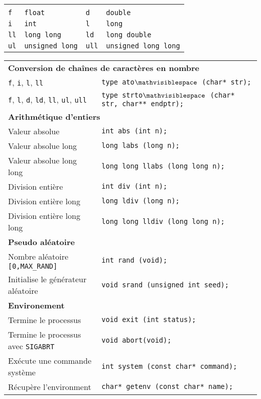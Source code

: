 \documentclass{article}
\newcommand{\spc}{$\mathvisiblespace$}
\newcommand{\cd}{\lstinline}
\begin{document}
\begin{multicols*}{3}
\begin{tabularx}{\linewidth}{
  >{\hsize=0.2\hsize}X%
  >{\hsize=1.8\hsize}X%
  >{\hsize=0.2\hsize}X%
  >{\hsize=1.8\hsize}X%
  }
  \multicolumn{4}{l}{\bf Suffix pour fonctions \cd{ato}\texttt{\spc} et \cd{strto}\texttt{\spc}}  \\
  \cd{f}  & \cd{float} & \cd{d} & \cd{double} \\
  \cd{i}  & \cd{int} & \cd{l} & \cd{long} \\
  \cd{ll}  & \cd{long long} & \cd{ld} & \cd{long double} \\
  \cd{ul}  & \cd{unsigned long} & \cd{ull} & \cd{unsigned long long} \\
\end{tabularx}

\begin{tabularx}{\linewidth}{Xl}
  \multicolumn{2}{l}{\bf Conversion de chaînes de caractères en nombre} \\
  \cd{f}, \cd{i}, \cd{l}, \cd{ll} & \cd{type ato}\texttt{\spc}\cd{ (char* str);} \\
  \cd{f}, \cd{l}, \cd{d}, \cd{ld}, \cd{ll}, \cd{ul}, \cd{ull} & \cd{type strto}\texttt{\spc}\cd{ (char* str, char** endptr);} \\

  \multicolumn{2}{l}{\bf Arithmétique d'entiers} \rule{0pt}{3ex}\\
  Valeur absolue & \cd{int abs (int n);} \\
  Valeur absolue long & \cd{long labs (long n);} \\
  Valeur absolue long long & \cd{long long llabs (long long n);} \\
  Division entière & \cd{int div (int n);} \\
  Division entière long & \cd{long ldiv (long n);} \\
  Division entière long long & \cd{long long lldiv (long long n);} \\

  \multicolumn{2}{l}{\bf Pseudo aléatoire} \rule{0pt}{3ex}\\
  Nombre aléatoire \cd{[0,MAX_RAND]} & \cd{int rand (void);} \\
  Initialise le générateur aléatoire & \cd{void srand (unsigned int seed);} \\

  \multicolumn{2}{l}{\bf Environement} \rule{0pt}{3ex}\\
  Termine le processus & \cd{void exit (int status);} \\
  Termine le processus avec \cd{SIGABRT} & \cd{void abort(void);} \\
  Exécute une commande système & \cd{int system (const char* command);} \\
  Récupère l'environment & \cd{char* getenv (const char* name);} \\


\end{tabularx}
\end{multicols*}
\end{document}

